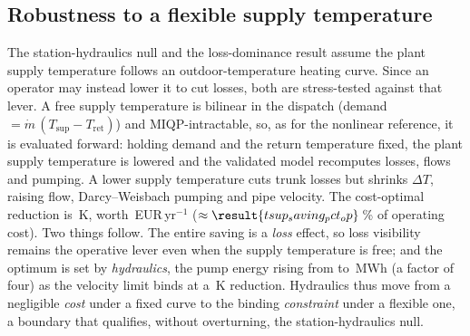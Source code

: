 \documentclass[a4paper,fleqn]{cas-sc}
\begin{document}
\subsection{Robustness to a flexible supply temperature}
\label{subsec:tsup}
The station-hydraulics null and the loss-dominance result assume the plant supply temperature
follows an outdoor-temperature heating curve. Since an operator may instead lower it to cut
losses, both are stress-tested against that lever. A free supply temperature is bilinear in the
dispatch (demand $=\dot m\,(T_\text{sup}-T_\text{ret})$) and MIQP-intractable, so, as for the
nonlinear reference, it is evaluated forward: holding demand and the return temperature fixed,
the plant supply temperature is lowered and the validated model recomputes losses, flows and
pumping. A lower supply temperature cuts trunk losses but shrinks $\Delta T$, raising flow,
Darcy--Weisbach pumping and pipe velocity. The cost-optimal reduction is
\,K, worth \,EUR\,yr$^{-1}$
($\approx\result{tsup_saving_pct_op}$\,\% of operating cost). Two things follow. The entire
saving is a \emph{loss} effect, so loss visibility remains the operative lever even when the
supply temperature is free; and the optimum is set by \emph{hydraulics}, the pump energy rising
from  to \,MWh (a factor of four) as the
velocity limit binds at a \,K reduction. Hydraulics thus move from
a negligible \emph{cost} under a fixed curve to the binding \emph{constraint} under a flexible
one, a boundary that qualifies, without overturning, the station-hydraulics null.

\end{document}

